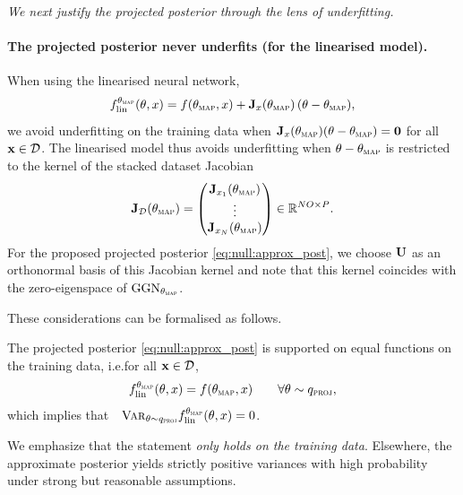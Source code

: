 \emph{We next justify the projected posterior through the lens of underfitting.}

\paragraph{The projected posterior never underfits (for the linearised model).}
When using the linearised neural network,
\begin{align}
f_{\mathrm{lin}}^{\theta_{\textsc{map}}}(\theta, x)
=
f(\theta_{\textsc{map}}, x) + \mathbf{J}_{x}(\theta_{\textsc{map}})\,(\theta-\theta_{\textsc{map}}), 
\end{align}
we avoid underfitting on the training data when $\mathbf{J}_{x}(\theta_{\textsc{map}})(\theta-\theta_{\textsc{map}}) = \mathbf{0}$ for all $\mathbf{x}\in\mathcal D$. The linearised model thus avoids underfitting when $\theta-\theta_{\textsc{map}}$ is restricted to the kernel of the stacked dataset Jacobian
\begin{align}
    \mathbf{J}_{\mathcal D}(\theta_{\textsc{map}})
=
\begin{pmatrix}
\mathbf{J}_{x_1}(\theta_{\textsc{map}})\\ \vdots \\ \mathbf{J}_{x_N}(\theta_{\textsc{map}})
\end{pmatrix}\in\mathbb{R}^{NO\times P}.
\end{align}
For the proposed projected posterior \eqref{eq:null:approx_post}, we choose $\mathbf{U}$ as an orthonormal basis of this Jacobian kernel and note that this kernel coincides with the zero-eigenspace of $\mathrm{GGN}_{\theta_{\textsc{map}}}$. 

These considerations can be formalised as follows.
\begin{lemma}
\label{lm:null:zero_var_train}
    The projected posterior \eqref{eq:null:approx_post} is supported on equal functions on the training data, i.e.\@ for all $\mathbf{x} \in \mathcal{D}$,
    \begin{align}
        f_{\mathrm{lin}}^{\theta_{\textsc{map}}}(\theta, x) = f(\theta_{\textsc{map}}, x)
        \qquad
        \forall \theta \sim q_{\textnormal{\textsc{proj}}},
    \end{align}
    which implies that~~$\textnormal{\textsc{Var}}_{\theta \sim q_{\textnormal{\textsc{proj}}}} f_{\mathrm{lin}}^{\theta_{\textsc{map}}}(\theta, x) = 0$.
\end{lemma}
We emphasize that the statement \emph{only holds on the training data}. Elsewhere, the approximate posterior yields strictly positive variances with high probability under strong but reasonable assumptions.

